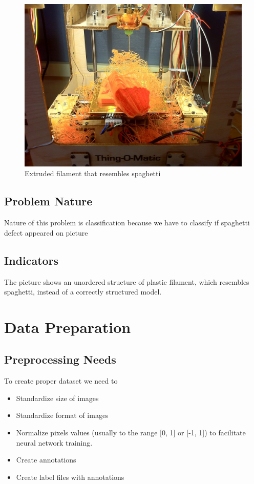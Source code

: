 \documentclass[12pt,a4paper]{article}
\begin{document}
\begin{figure}[h]
    \centering
    \includegraphics[width=0.8\linewidth]{spaghetti3D.jpg}
    \caption{Extruded filament that resembles spaghetti}
    \label{fig:spaghetti3D}
    \end{figure}

\subsection{Problem Nature}
Nature of this problem is classification because we have to classify if spaghetti defect appeared on picture
\subsection{Indicators}
The picture shows an unordered structure of plastic filament, which resembles spaghetti, instead of a correctly structured model.

\section{Data Preparation}
\subsection{Preprocessing Needs}
To create proper dataset we need to 
\begin{itemize}
    \item Standardize size of images
    \item Standardize format of images
    \item Normalize pixels values (usually to the range [0, 1] or [-1, 1]) to facilitate neural network training.
    \item Create annotations
    \item Create label files with annotations
\end{itemize}
\end{document}
